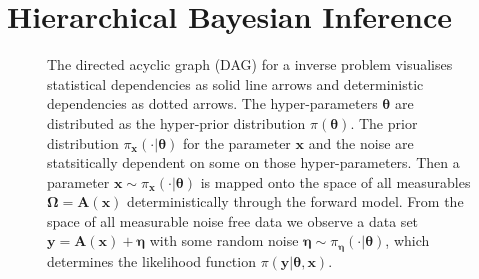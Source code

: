 \section{Hierarchical Bayesian Inference}
\label{sec:bayes}
\begin{figure}[ht!]
	\centering
	\caption[Hierarchichal Bayesian Inference -- DAG]{The directed acyclic graph (DAG) for a inverse problem visualises statistical dependencies as solid line arrows and deterministic dependencies as dotted arrows.
	The hyper-parameters $\bm{\theta}$ are distributed as the hyper-prior distribution $\pi(\bm{\theta})$.
	The prior distribution $ \pi_{\bm{x}}(\cdot|\bm{\theta})$ for the parameter $\bm{x}$ and the noise are statsitically dependent on some on those hyper-parameters.
	 Then a parameter $\bm{x} \sim \pi_{\bm{x}}(\cdot|\bm{\theta})$ is mapped onto the space of all measurables $\bm{\Omega}=\bm{A}(\bm{x})$ deterministically through the forward model.
	From the space of all measurable noise free data we observe a data set $\bm{y} = \bm{A}(\bm{x}) + \bm{\eta}$ with some random noise $ \bm{\eta} \sim \pi_{\bm{\eta}}(\cdot|\bm{\theta})$, which determines the likelihood function $\pi(\bm{y}|\bm{\theta}, \bm{x})$. }
	\label{fig:FirstDAG}
\end{figure}

